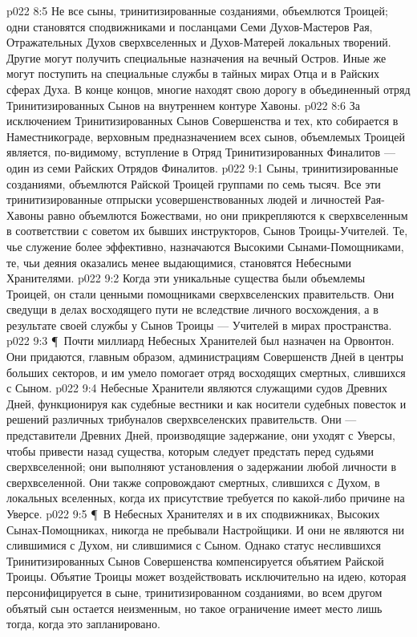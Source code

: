\vs p022 8:5 Не все сыны, тринитизированные созданиями, объемлются Троицей; одни становятся сподвижниками и посланцами Семи Духов\hyp{}Мастеров Рая, Отражательных Духов сверхвселенных и Духов\hyp{}Матерей локальных творений. Другие могут получить специальные назначения на вечный Остров. Иные же могут поступить на специальные службы в тайных мирах Отца и в Райских сферах Духа. В конце концов, многие находят свою дорогу в объединенный отряд Тринитизированных Сынов на внутреннем контуре Хавоны.
\vs p022 8:6 За исключением Тринитизированных Сынов Совершенства и тех, кто собирается в Наместникограде, верховным предназначением всех сынов, объемлемых Троицей является, по\hyp{}видимому, вступление в Отряд Тринитизированных Финалитов --- один из семи Райских Отрядов Финалитов.
\vs p022 9:1 Сыны, тринитизированные созданиями, объемлются Райской Троицей группами по семь тысяч. Все эти тринитизированные отпрыски усовершенствованных людей и личностей Рая\hyp{}Хавоны равно объемлются Божествами, но они прикрепляются к сверхвселенным в соответствии с советом их бывших инструкторов, Сынов Троицы\hyp{}Учителей. Те, чье служение более эффективно, назначаются Высокими Сынами\hyp{}Помощниками, те, чьи деяния оказались менее выдающимися, становятся Небесными Хранителями.
\vs p022 9:2 Когда эти уникальные существа были объемлемы Троицей, он стали ценными помощниками сверхвселенских правительств. Они сведущи в делах восходящего пути не вследствие личного восхождения, а в результате своей службы у Сынов Троицы --- Учителей в мирах пространства.
\vs p022 9:3 \P\ Почти миллиард Небесных Хранителей был назначен на Орвонтон. Они придаются, главным образом, администрациям Совершенств Дней в центры больших секторов, и им умело помогает отряд восходящих смертных, слившихся с Сыном.
\vs p022 9:4 Небесные Хранители являются служащими судов Древних Дней, функционируя как судебные вестники и как носители судебных повесток и решений различных трибуналов сверхвселенских правительств. Они --- представители Древних Дней, производящие задержание, они уходят с Уверсы, чтобы привести назад существа, которым следует предстать перед судьями сверхвселенной; они выполняют установления о задержании любой личности в сверхвселенной. Они также сопровождают смертных, слившихся с Духом, в локальных вселенных, когда их присутствие требуется по какой\hyp{}либо причине на Уверсе.
\vs p022 9:5 \P\ В Небесных Хранителях и в их сподвижниках, Высоких Сынах\hyp{}Помощниках, никогда не пребывали Настройщики. И они не являются ни слившимися с Духом, ни слившимися с Сыном. Однако статус неслившихся Тринитизированных Сынов Совершенства компенсируется объятием Райской Троицы. Объятие Троицы может воздействовать исключительно на идею, которая персонифицируется в сыне, тринитизированном созданиями, во всем другом объятый сын остается неизменным, но такое ограничение имеет место лишь тогда, когда это запланировано.
